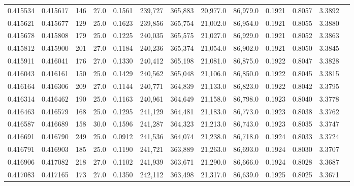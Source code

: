 \begin{tabular}{rrrrrrrrrrrrr}
0.415534 & 0.415617 &   146 & 27.0 &                                     0.1561 & 239,727 & 365,883 &  20,977.0 &  86,979.0 & 0.1921 & 0.8057 & 3.3892 \\
0.415621 & 0.415677 &   129 & 25.0 &                                     0.1623 & 239,856 & 365,754 &  21,002.0 &  86,954.0 & 0.1921 & 0.8055 & 3.3880 \\
0.415678 & 0.415808 &   179 & 25.0 &                                     0.1225 & 240,035 & 365,575 &  21,027.0 &  86,929.0 & 0.1921 & 0.8052 & 3.3863 \\
0.415812 & 0.415900 &   201 & 27.0 &                                     0.1184 & 240,236 & 365,374 &  21,054.0 &  86,902.0 & 0.1921 & 0.8050 & 3.3845 \\
0.415911 & 0.416041 &   176 & 27.0 &                                     0.1330 & 240,412 & 365,198 &  21,081.0 &  86,875.0 & 0.1922 & 0.8047 & 3.3828 \\
0.416043 & 0.416161 &   150 & 25.0 &                                     0.1429 & 240,562 & 365,048 &  21,106.0 &  86,850.0 & 0.1922 & 0.8045 & 3.3815 \\
0.416164 & 0.416306 &   209 & 27.0 &                                     0.1144 & 240,771 & 364,839 &  21,133.0 &  86,823.0 & 0.1922 & 0.8042 & 3.3795 \\
0.416314 & 0.416462 &   190 & 25.0 &                                     0.1163 & 240,961 & 364,649 &  21,158.0 &  86,798.0 & 0.1923 & 0.8040 & 3.3778 \\
0.416463 & 0.416579 &   168 & 25.0 &                                     0.1295 & 241,129 & 364,481 &  21,183.0 &  86,773.0 & 0.1923 & 0.8038 & 3.3762 \\
0.416587 & 0.416689 &   158 & 30.0 &                                     0.1596 & 241,287 & 364,323 &  21,213.0 &  86,743.0 & 0.1923 & 0.8035 & 3.3747 \\
0.416691 & 0.416790 &   249 & 25.0 &                                     0.0912 & 241,536 & 364,074 &  21,238.0 &  86,718.0 & 0.1924 & 0.8033 & 3.3724 \\
0.416791 & 0.416903 &   185 & 25.0 &                                     0.1190 & 241,721 & 363,889 &  21,263.0 &  86,693.0 & 0.1924 & 0.8030 & 3.3707 \\
0.416906 & 0.417082 &   218 & 27.0 &                                     0.1102 & 241,939 & 363,671 &  21,290.0 &  86,666.0 & 0.1924 & 0.8028 & 3.3687 \\
0.417083 & 0.417165 &   173 & 27.0 &                                     0.1350 & 242,112 & 363,498 &  21,317.0 &  86,639.0 & 0.1925 & 0.8025 & 3.3671 \\

\end{tabular}
